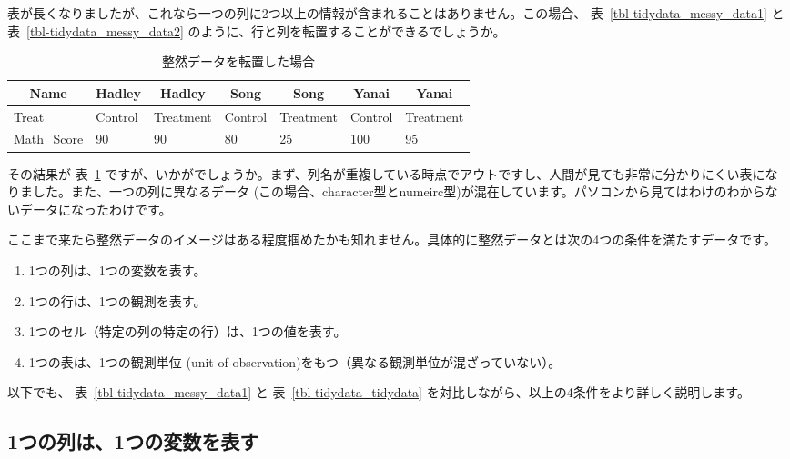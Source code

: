\documentclass[
  a4paper,
  pandoc,
  ja=standard,
  jafont=haranoaji]{bxjsbook}
\providecommand{\tightlist}{%
  \setlength{\itemsep}{0pt}\setlength{\parskip}{0pt}}
\begin{document}
表が長くなりましたが、これなら一つの列に2つ以上の情報が含まれることはありません。この場合、
表~\ref{tbl-tidydata_messy_data1} と 表~\ref{tbl-tidydata_messy_data2}
のように、行と列を転置することができるでしょうか。

\hypertarget{tbl-tidydata_transdata}{}
\begin{table}
\caption{\label{tbl-tidydata_transdata}整然データを転置した場合 }

\centering
\begin{tabular}{l|l|l|l|l|l|l}
\hline
\multicolumn{1}{c}{Name} & \multicolumn{1}{c}{Hadley} & \multicolumn{1}{c}{Hadley} & \multicolumn{1}{c}{Song} & \multicolumn{1}{c}{Song} & \multicolumn{1}{c}{Yanai} & \multicolumn{1}{c}{Yanai}\\
\hline
Treat & Control & Treatment & Control & Treatment & Control & Treatment\\
\hline
Math\_Score & 90 & 90 & 80 & 25 & 100 & 95\\
\hline
\end{tabular}
\end{table}

その結果が 表~\ref{tbl-tidydata_transdata}
ですが、いかがでしょうか。まず、列名が重複している時点でアウトですし、人間が見ても非常に分かりにくい表になりました。また、一つの列に異なるデータ
(この場合、character型とnumeirc型)が混在しています。パソコンから見てはわけのわからないデータになったわけです。

ここまで来たら整然データのイメージはある程度掴めたかも知れません。具体的に整然データとは次の4つの条件を満たすデータです\citep{Wickham:2014}。

\begin{enumerate}
\def\labelenumi{\arabic{enumi}.}
\tightlist
\item
  1つの列は、1つの変数を表す。
\item
  1つの行は、1つの観測を表す。
\item
  1つのセル（特定の列の特定の行）は、1つの値を表す。
\item
  1つの表は、1つの観測単位 (unit of
  observation)をもつ（異なる観測単位が混ざっていない）。
\end{enumerate}

以下でも、 表~\ref{tbl-tidydata_messy_data1} と
表~\ref{tbl-tidydata_tidydata}
を対比しながら、以上の4条件をより詳しく説明します。

\hypertarget{ux3064ux306eux5217ux306f1ux3064ux306eux5909ux6570ux3092ux8868ux3059}{%
\subsection{1つの列は、1つの変数を表す}\label{ux3064ux306eux5217ux306f1ux3064ux306eux5909ux6570ux3092ux8868ux3059}}
\end{document}
